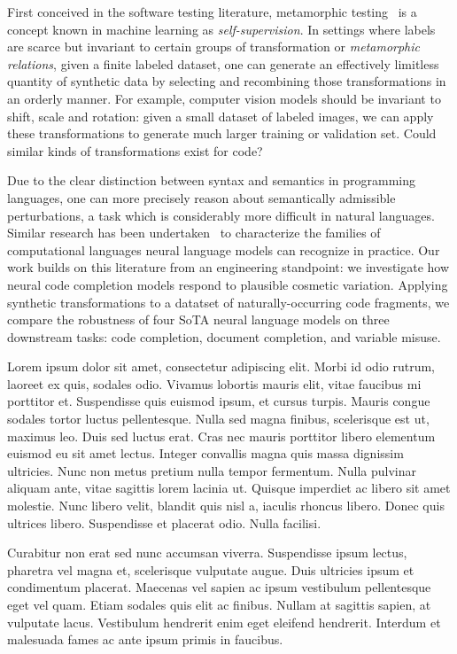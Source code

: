 \documentclass[usenames,dvipsnames]{article} %
\begin{document}
  First conceived in the software testing literature, metamorphic testing~\cite{chen1995metamorphic} is a concept known in machine learning as \textit{self-supervision}. In settings where labels are scarce but invariant to certain groups of transformation or \textit{metamorphic relations}, given a finite labeled dataset, one can generate an effectively limitless quantity of synthetic data by selecting and recombining those transformations in an orderly manner. For example, computer vision models should be invariant to shift, scale and rotation: given a small dataset of labeled images, we can apply these transformations to generate much larger training or validation set. Could similar kinds of transformations exist for code?

  Due to the clear distinction between syntax and semantics in programming languages, one can more precisely reason about semantically admissible perturbations, a task which is considerably more difficult in natural languages. Similar research has been undertaken~\citep{weiss2018practical, chirkova2020empirical, chen2021evaluating} to characterize the families of computational languages neural language models can recognize in practice. Our work builds on this literature from an engineering standpoint: we investigate how neural code completion models respond to plausible cosmetic variation. Applying synthetic transformations to a datatset of naturally-occurring code fragments, we compare the robustness of four SoTA neural language models on three downstream tasks: code completion, document completion, and variable misuse.


  Lorem ipsum dolor sit amet, consectetur adipiscing elit. Morbi id odio rutrum, laoreet ex quis, sodales odio. Vivamus lobortis mauris elit, vitae faucibus mi porttitor et. Suspendisse quis euismod ipsum, et cursus turpis. Mauris congue sodales tortor luctus pellentesque. Nulla sed magna finibus, scelerisque est ut, maximus leo. Duis sed luctus erat. Cras nec mauris porttitor libero elementum euismod eu sit amet lectus. Integer convallis magna quis massa dignissim ultricies. Nunc non metus pretium nulla tempor fermentum. Nulla pulvinar aliquam ante, vitae sagittis lorem lacinia ut. Quisque imperdiet ac libero sit amet molestie. Nunc libero velit, blandit quis nisl a, iaculis rhoncus libero. Donec quis ultrices libero. Suspendisse et placerat odio. Nulla facilisi.

  Curabitur non erat sed nunc accumsan viverra. Suspendisse ipsum lectus, pharetra vel magna et, scelerisque vulputate augue. Duis ultricies ipsum et condimentum placerat. Maecenas vel sapien ac ipsum vestibulum pellentesque eget vel quam. Etiam sodales quis elit ac finibus. Nullam at sagittis sapien, at vulputate lacus. Vestibulum hendrerit enim eget eleifend hendrerit. Interdum et malesuada fames ac ante ipsum primis in faucibus.
\end{document}
